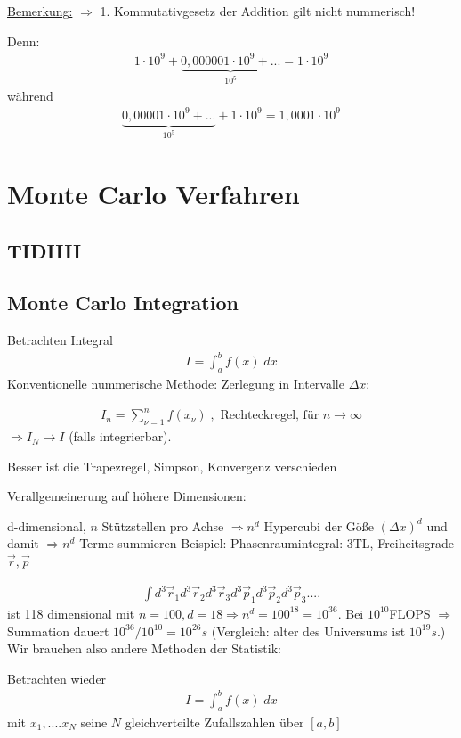 \documentclass[12pt]{article}
\begin{document}
\underline{Bemerkung:} $\Rightarrow $ 1. Kommutativgesetz der Addition gilt nicht nummerisch! 

Denn:
\begin{align*}
1 \cdot 10^9 + \underbrace{ 0,000001 \cdot 10^9 + ... }_{10^{5}} = 1 \cdot 10^9
\end{align*}
während
\begin{align*}
\underbrace{0,00001 \cdot 10^9 + ... }_{10^5} + 1 \cdot 10^9 = 1,0001 \cdot 10^9
\end{align*}
\section{Monte Carlo Verfahren}
\subsection{TIDIIII}
\subsection{ Monte Carlo Integration}
Betrachten Integral 
\begin{align}
I= \int_a^b f(x) \; dx
\end{align}
Konventionelle nummerische Methode: Zerlegung in Intervalle $\Delta x$:

\begin{align}
I_n= \sum_{\nu =1}^n f(x_\nu) \; , \mbox{ Rechteckregel, für } n \to \infty
\end{align}
$\Rightarrow I_N \to I$ (falls integrierbar).

Besser ist die Trapezregel, Simpson, Konvergenz verschieden

Verallgemeinerung auf höhere Dimensionen:

d-dimensional, $n$ Stützstellen pro Achse $\Rightarrow n^d$ Hypercubi der Göße $(\Delta x)^d$ und damit $\Rightarrow n^d$ Terme summieren
Beispiel: Phasenraumintegral: 3TL, Freiheitsgrade $\vec{r}, \vec{p}$

\begin{align}
\int d^3 \vec{r}_1 d^3 \vec{r}_2 d^3 \vec{r}_3 d^3 \vec{p}_1 d^3 \vec{p}_2 d^3 \vec{p}_3 .... 
\end{align} %
ist 118 dimensional mit $n=100, d=18 \Rightarrow n^d=100^18=10^36$. Bei $10^10$FLOPS
$\Rightarrow$ Summation dauert $10^{36 } / 10^{10}= 10^{26}s$ (Vergleich: alter des Universums ist $10^{19}s$.)
Wir brauchen also andere Methoden der Statistik:

Betrachten wieder 
\begin{align}
I= \int_a^b f(x) \; dx
\end{align}
mit $x_1,....x_N$ seine $N$ gleichverteilte Zufallszahlen über $[a,b]$ %
\end{document}
